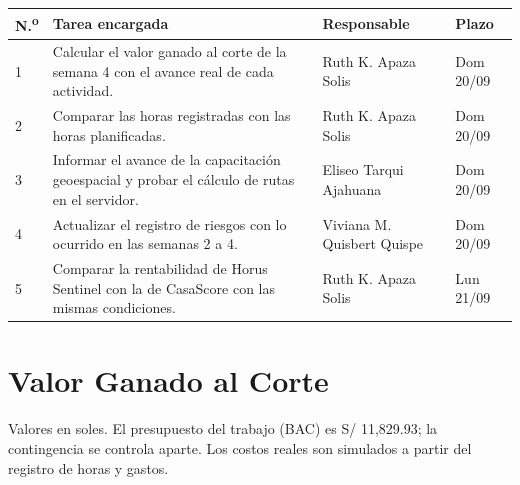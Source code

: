 \documentclass[11pt,a4paper]{article}
\begin{document}
\vspace{0.1cm}
{\small
{}
\noindent\begin{tabularx}{\textwidth}{@{}C{0.7cm} L P{3.4cm} C{1.9cm}@{}}
\toprule
{}
\textbf{N.\textsuperscript{o}} & \textbf{Tarea encargada} & \textbf{Responsable} & \textbf{Plazo} \\
 & Calcular el valor ganado al corte de la semana 4 con el avance real de cada actividad. & Ruth K. Apaza Solis & Dom 20/09 \\
2 & Comparar las horas registradas con las horas planificadas. & Ruth K. Apaza Solis & Dom 20/09 \\
3 & Informar el avance de la capacitación geoespacial y probar el cálculo de rutas en el servidor. & Eliseo Tarqui Ajahuana & Dom 20/09 \\
4 & Actualizar el registro de riesgos con lo ocurrido en las semanas 2 a 4. & Viviana M. Quisbert Quispe & Dom 20/09 \\
5 & Comparar la rentabilidad de Horus Sentinel con la de CasaScore con las mismas condiciones. & Ruth K. Apaza Solis & Lun 21/09 \\
\bottomrule
\end{tabularx}
}

\section{Valor Ganado al Corte}
Valores en soles. El presupuesto del trabajo (BAC) es S/ 11,829.93; la contingencia se controla aparte. Los costos reales son simulados a partir del registro de horas y gastos.
\end{document}
